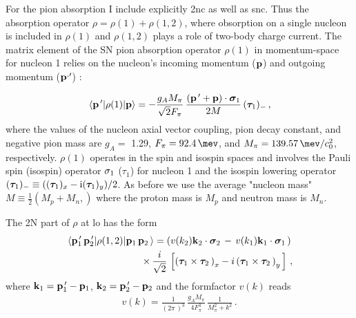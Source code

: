     For the pion absorption I include explicitly \gls{2nc} as well as \gls{snc}.
    Thus the absorption operator $\rho = \rho(1) + \rho(1, 2)$,
    where obsorption on  a single nucleon is included in $\rho(1)$ and
    $\rho(1, 2)$ plays a role of two-body charge current.
    The matrix element of the SN pion absorption operator $\rho(1)$ in momentum-space for nucleon 1 relies on the
    nucleon's incoming momentum (${\bf p}$) and outgoing momentum (${\bf p}^{, \prime}$) \cite{BERNARD_1995}:

    \begin{eqnarray}
        \matrixel{{\bf p}^{\, \prime}} 
        {\rho(1)} {{\bf p}} = 
        - \frac{g_A M_\pi}{\sqrt{2} F_\pi } \,
            \frac{ \left( {\bf p}^{\, \prime} +  {\bf p} \right) \cdot {\bm \sigma}_1 } { 2 M } \, 
            ({\bm \tau}_{1})_- \, ,
    \label{rho1}
    \end{eqnarray}
    where the values of the nucleon axial vector coupling, pion decay constant, and negative pion mass are $g_A =$ 1.29, 
    $F_\pi = \SI{92.4}{\mev}$, and $M_\pi = \SI{139.57}{\mev \per \clight\squared}$, respectively. $\rho (1)$ operates in the spin
    and isospin spaces and involves the Pauli spin (isospin) operator ${\bf \sigma}_1$ ($\tau_1$) for nucleon 1 and the isospin lowering operator
    $({\bm \tau}_{1})_- \equiv(({\bm \tau}_1)_x -{\rm i} ({\bm \tau}_1)_y)/2$.
    As before we use the average 
    "nucleon mass" $M \equiv \frac{1}{2} \left( M_p + M_n , \right)$ where the proton mass is $M_p$ and neutron mass is $M_n$.



    The 2N part of $\rho$ at \gls{lo} has the form \cite{Lensky2006}
    \begin{eqnarray}
    \matrixel{
        {\bf p}_1^{\, \prime}\,
        {\bf p}_2^{\, \prime}
        } 
    {\rho(1,2)}
    {
        {\bf p}_1 \, 
        {\bf p}_2 \, 
        } = 
        \left(
        v( k_2 )  {\bf k}_2 \cdot {\bm \sigma}_2 \, - \, 
        v( k_1 )  {\bf k}_1 \cdot {\bm \sigma}_1 \,
        \right) \, \nonumber \\ \times \,
        \frac{i}{\sqrt{2}} \, 
        \left[ 
            \left( {\bm \tau}_1 \times {\bm \tau}_2 \, \right)_x 
            - i \left( {\bm \tau}_1 \times {\bm \tau}_2 \, \right)_y \,
        \right] \,,
    \label{rho12}
    \end{eqnarray}
    where 
    $ {\bf k}_1 = {\bf p}_1^{\, \prime} - {\bf p}_1 $,
    $ {\bf k}_2 = {\bf p}_2^{\, \prime} - {\bf p}_2 $
    and the formfactor $v(k)$ reads 
    \begin{eqnarray}
    v (k) = \frac 1{ \left( 2 \pi \, \right)^3 } \,
            \frac{g_A M_\pi}{4 F_\pi^3 } \,
        \frac1{M_\pi^2 + k^2 } \, .
    \label{vk}
    \end{eqnarray}

